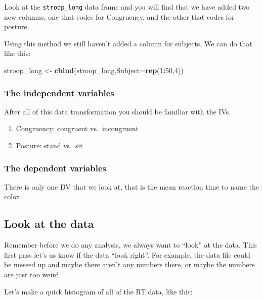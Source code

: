 \documentclass[]{book}
\newenvironment{Shaded}{\begin{snugshade}}{\end{snugshade}}
\newcommand{\KeywordTok}[1]{\textcolor[rgb]{0.13,0.29,0.53}{\textbf{#1}}}
\newcommand{\DataTypeTok}[1]{\textcolor[rgb]{0.13,0.29,0.53}{#1}}
\newcommand{\DecValTok}[1]{\textcolor[rgb]{0.00,0.00,0.81}{#1}}
\newcommand{\StringTok}[1]{\textcolor[rgb]{0.31,0.60,0.02}{#1}}
\newcommand{\OperatorTok}[1]{\textcolor[rgb]{0.81,0.36,0.00}{\textbf{#1}}}
\newcommand{\NormalTok}[1]{#1}
\providecommand{\tightlist}{%
  \setlength{\itemsep}{0pt}\setlength{\parskip}{0pt}}
\begin{document}
Look at the \texttt{stroop\_long} data frame and you will find that we
have added two new columns, one that codes for Congruency, and the other
that codes for posture.

Using this method we still haven't added a column for subjects. We can
do that like this:

\begin{Shaded}
\begin{Highlighting}[]
\NormalTok{stroop_long <-}\StringTok{ }\KeywordTok{cbind}\NormalTok{(stroop_long,}\DataTypeTok{Subject=}\KeywordTok{rep}\NormalTok{(}\DecValTok{1}\OperatorTok{:}\DecValTok{50}\NormalTok{,}\DecValTok{4}\NormalTok{))}
\end{Highlighting}
\end{Shaded}

\subsubsection{The independent
variables}\label{the-independent-variables}

After all of this data transformation you should be familiar with the
IVs.

\begin{enumerate}
\def\labelenumi{\arabic{enumi}.}
\tightlist
\item
  Congruency: congruent vs.~incongruent
\item
  Posture: stand vs.~sit
\end{enumerate}

\subsubsection{The dependent variables}\label{the-dependent-variables-1}

There is only one DV that we look at, that is the mean reaction time to
name the color.

\subsection{Look at the data}\label{look-at-the-data-4}

Remember before we do any analysis, we always want to ``look'' at the
data. This first pass let's us know if the data ``look right''. For
example, the data file could be messed up and maybe there aren't any
numbers there, or maybe the numbers are just too weird.

Let's make a quick histogram of all of the RT data, like this:
\end{document}
